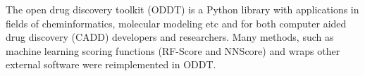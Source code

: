 The open drug discovery toolkit (ODDT) is a Python library with applications in fields of cheminformatics, molecular modeling etc and for both computer aided drug discovery (CADD) developers and researchers. Many methods, such as machine learning scoring functions (RF-Score and NNScore) and wraps other external software were reimplemented in ODDT\cite{W_jcikowski_2015}. 